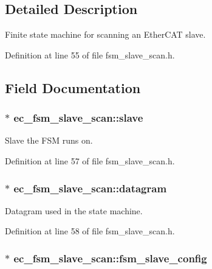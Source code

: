 \subsection{\-Detailed \-Description}
\-Finite state machine for scanning an \-Ether\-C\-A\-T slave. 

\-Definition at line 55 of file fsm\-\_\-slave\-\_\-scan.\-h.



\subsection{\-Field \-Documentation}
\subsubsection[{slave}]{$\ast$ {\bf ec\-\_\-fsm\-\_\-slave\-\_\-scan\-::slave}}\label{structec__fsm__slave__scan_a54c987af1db08e3a333d98f76d71de15}


\-Slave the \-F\-S\-M runs on. 



\-Definition at line 57 of file fsm\-\_\-slave\-\_\-scan.\-h.

\subsubsection[{datagram}]{$\ast$ {\bf ec\-\_\-fsm\-\_\-slave\-\_\-scan\-::datagram}}\label{structec__fsm__slave__scan_a93ae94f618186affb1530667745ba774}


\-Datagram used in the state machine. 



\-Definition at line 58 of file fsm\-\_\-slave\-\_\-scan.\-h.

\subsubsection[{fsm\-\_\-slave\-\_\-config}]{$\ast$ {\bf ec\-\_\-fsm\-\_\-slave\-\_\-scan\-::fsm\-\_\-slave\-\_\-config}}\label{structec__fsm__slave__scan_a39373f1c4e973c777cd3e27e040b8f66}


